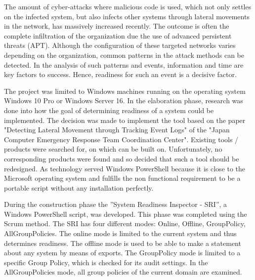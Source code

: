 
\thispagestyle{plain}
\renewcommand\section{\stdsection}
The amount of cyber-attacks where malicious code is used, which not only settles on the infected system, but also infects other systems through lateral movements in the network, has massively increased recently. The outcome is often the complete infiltration of the organization due the use of advanced persistent threats (APT). Although the configuration of these targeted networks varies depending on the organization, common patterns in the attack methods can be detected. In the analysis of such patterns and events, information and time are key factors to success. Hence, readiness for such an event is a decisive factor.

The project was limited to Windows machines running on the operating system Windows 10 Pro or Windows Server 16. In the elaboration phase, research was done into how the goal of determining readiness of a system could be implemented. The decision was made to implement the tool based on the paper "Detecting Lateral Movement through Tracking Event Logs" of the "Japan Computer Emergency Response Team Coordination Center". Existing tools / products were searched for, on which can be built on. Unfortunately, no corresponding products were found and so decided that such a tool should be redesigned. As technology served Windows PowerShell because it is close to the Microsoft operating system and fulfills the non functional requirement to be a portable script without any installation perfectly.


During the construction phase the ''System Readiness Inspector - SRI'', a Windows PowerShell script, was developed. This phase was completed using the Scrum method. The SRI has four different modes: Online, Offline, GroupPolicy, AllGroupPolicies. The online mode is limited to the current system and thus determines readiness. The offline mode is used to be able to make a statement about any system by means of exports. The GroupPolicy mode is limited to a specific Group Policy, which is checked for its audit settings. In the AllGroupPolicies mode, all group policies of the current domain are examined. 
\thispagestyle{plain}